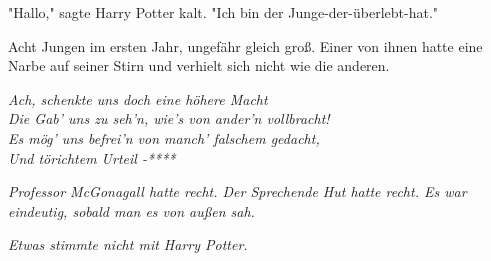 {"Hallo," sagte Harry Potter kalt. "Ich bin der Junge-der-überlebt-hat."

Acht Jungen im ersten Jahr, ungefähr gleich groß. Einer von ihnen hatte eine Narbe auf seiner Stirn und verhielt sich nicht wie die anderen.

\emph{Ach, schenkte uns doch eine höhere Macht\\ Die Gab' uns zu seh'n, wie's von ander'n vollbracht!\\ Es mög' uns befrei'n von manch' falschem gedacht,\\ Und törichtem Urteil -****}

\emph{Professor McGonagall hatte recht. Der Sprechende Hut hatte recht. Es war eindeutig, sobald man es von außen sah.}

\emph{Etwas stimmte nicht mit Harry Potter.}

}

